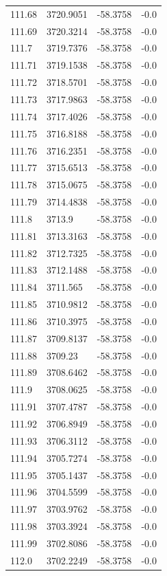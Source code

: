 \begin{table}[H]
\begin{tabular}{llll}
111.68 & 3720.9051 & -58.3758 & -0.0 \\
111.69 & 3720.3214 & -58.3758 & -0.0 \\
111.7 & 3719.7376 & -58.3758 & -0.0 \\
111.71 & 3719.1538 & -58.3758 & -0.0 \\
111.72 & 3718.5701 & -58.3758 & -0.0 \\
111.73 & 3717.9863 & -58.3758 & -0.0 \\
111.74 & 3717.4026 & -58.3758 & -0.0 \\
111.75 & 3716.8188 & -58.3758 & -0.0 \\
111.76 & 3716.2351 & -58.3758 & -0.0 \\
111.77 & 3715.6513 & -58.3758 & -0.0 \\
111.78 & 3715.0675 & -58.3758 & -0.0 \\
111.79 & 3714.4838 & -58.3758 & -0.0 \\
111.8 & 3713.9 & -58.3758 & -0.0 \\
111.81 & 3713.3163 & -58.3758 & -0.0 \\
111.82 & 3712.7325 & -58.3758 & -0.0 \\
111.83 & 3712.1488 & -58.3758 & -0.0 \\
111.84 & 3711.565 & -58.3758 & -0.0 \\
111.85 & 3710.9812 & -58.3758 & -0.0 \\
111.86 & 3710.3975 & -58.3758 & -0.0 \\
111.87 & 3709.8137 & -58.3758 & -0.0 \\
111.88 & 3709.23 & -58.3758 & -0.0 \\
111.89 & 3708.6462 & -58.3758 & -0.0 \\
111.9 & 3708.0625 & -58.3758 & -0.0 \\
111.91 & 3707.4787 & -58.3758 & -0.0 \\
111.92 & 3706.8949 & -58.3758 & -0.0 \\
111.93 & 3706.3112 & -58.3758 & -0.0 \\
111.94 & 3705.7274 & -58.3758 & -0.0 \\
111.95 & 3705.1437 & -58.3758 & -0.0 \\
111.96 & 3704.5599 & -58.3758 & -0.0 \\
111.97 & 3703.9762 & -58.3758 & -0.0 \\
111.98 & 3703.3924 & -58.3758 & -0.0 \\
111.99 & 3702.8086 & -58.3758 & -0.0 \\
112.0 & 3702.2249 & -58.3758 & -0.0 \\

\end{tabular}
\end{table}
